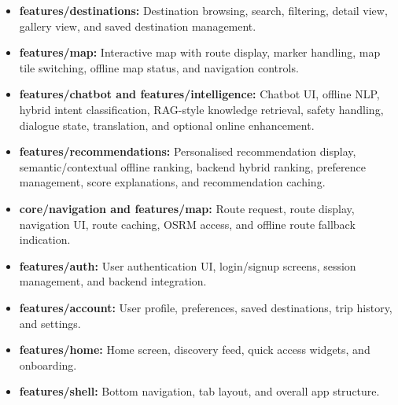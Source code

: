 \documentclass[12pt,a4paper,oneside]{report}
\begin{document}
\begin{itemize}
\item \textbf{features/destinations:} Destination browsing, search, filtering, detail view, gallery view, and saved destination management.
\item \textbf{features/map:} Interactive map with route display, marker handling, map tile switching, offline map status, and navigation controls.
\item \textbf{features/chatbot and features/intelligence:} Chatbot UI, offline NLP, hybrid intent classification, RAG-style knowledge retrieval, safety handling, dialogue state, translation, and optional online enhancement.
\item \textbf{features/recommendations:} Personalised recommendation display, semantic/contextual offline ranking, backend hybrid ranking, preference management, score explanations, and recommendation caching.
\item \textbf{core/navigation and features/map:} Route request, route display, navigation UI, route caching, OSRM access, and offline route fallback indication.
\item \textbf{features/auth:} User authentication UI, login/signup screens, session management, and backend integration.
\item \textbf{features/account:} User profile, preferences, saved destinations, trip history, and settings.
\item \textbf{features/home:} Home screen, discovery feed, quick access widgets, and onboarding.
\item \textbf{features/shell:} Bottom navigation, tab layout, and overall app structure.
\end{itemize}
\end{document}
